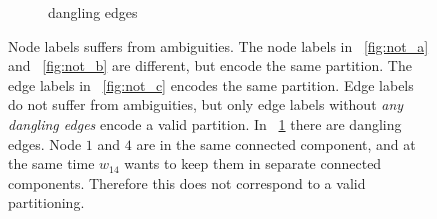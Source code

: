\begin{center}
\begin{figure}[h]
\begin{tiny}
\begin{subfigure}[t]{0.22\linewidth}
{
    }
\caption{ \tiny{dangling edges}}
\label{fig:not_d}
\end{subfigure}
\end{tiny}
\caption{
Node labels suffers from ambiguities. 
The node labels in 
~\ref{fig:not_a} and ~\ref{fig:not_b} are 
different, but encode the same partition.
The edge labels in ~\ref{fig:not_c}
encodes the same partition. Edge
labels do not suffer from ambiguities, but only
edge labels without \emph{any dangling edges}
encode a valid partition. In ~\ref{fig:not_d}
there are dangling edges. Node $1$ and $4$ 
are in the same connected component, 
and at the same time $w_{14}$ wants to keep
them in separate connected components.
Therefore this does
not correspond to a valid partitioning.
}\label{fig:notation}
\end{figure}
\end{center}



